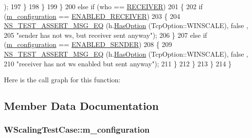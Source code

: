 \begin{DoxyCode}
      );
197                 \}
198             \}
199         \}
200       \textcolor{keywordflow}{else} \textcolor{keywordflow}{if} (who == \hyperlink{classns3_1_1TcpGeneralTest_a29338e6b7137cad650c2ff835713f6eea2a9a39a8fe1edd25b643a48956b8ecff}{RECEIVER})
201         \{
202           \textcolor{keywordflow}{if} (\hyperlink{classWScalingTestCase_a72831e1b3b682abc7055beee2e0022c1}{m\_configuration} == \hyperlink{classWScalingTestCase_a6b31fa8be505eaac47c2383fb17dc5fda2019990e4d73c728a156c14570c9feef}{ENABLED\_RECEIVER})
203             \{
204               \hyperlink{group__testing_ga2a9d78cffb3db8e867c35fff0b698cf5}{NS\_TEST\_ASSERT\_MSG\_EQ} (h.\hyperlink{classns3_1_1TcpHeader_aacc07bdab91925f1cddf9bcb1ae91d13}{HasOption} (TcpOption::WINSCALE), \textcolor{keyword}{false}
      ,
205                                      \textcolor{stringliteral}{"sender has not ws, but receiver sent anyway"});
206             \}
207           \textcolor{keywordflow}{else} \textcolor{keywordflow}{if} (\hyperlink{classWScalingTestCase_a72831e1b3b682abc7055beee2e0022c1}{m\_configuration} == \hyperlink{classWScalingTestCase_a6b31fa8be505eaac47c2383fb17dc5fda605d0a930221d4226dfee3e4c89b47a3}{ENABLED\_SENDER})
208             \{
209               \hyperlink{group__testing_ga2a9d78cffb3db8e867c35fff0b698cf5}{NS\_TEST\_ASSERT\_MSG\_EQ} (h.\hyperlink{classns3_1_1TcpHeader_aacc07bdab91925f1cddf9bcb1ae91d13}{HasOption} (TcpOption::WINSCALE), \textcolor{keyword}{false}
      ,
210                                      \textcolor{stringliteral}{"receiver has not ws enabled but sent anyway"});
211             \}
212         \}
213     \}
214 \}
\end{DoxyCode}


Here is the call graph for this function\+:




\subsection{Member Data Documentation}
\subsubsection[{\texorpdfstring{m\+\_\+configuration}{m_configuration}}]{ W\+Scaling\+Test\+Case\+::m\+\_\+configuration\hspace{0.3cm}{\ttfamily [protected]}}\hypertarget{classWScalingTestCase_a72831e1b3b682abc7055beee2e0022c1}{}\label{classWScalingTestCase_a72831e1b3b682abc7055beee2e0022c1}


